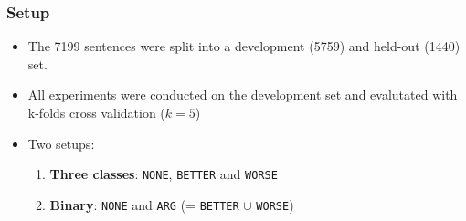 \documentclass[11pt,aspectratio=169,usenames,dvipsnames]{beamer}
\begin{document}
    
    
        \begin{frame}[t]
        \frametitle{Setup}
        \begin{itemize}
            \item The 7199 sentences were split into a development (5759) and held-out (1440) set.
            \item All experiments were conducted on the development set and evalutated with k-folds cross validation ($k = 5$)\pause
            \item Two setups: 
            \begin{enumerate}
            \item \textbf{Three classes}: \texttt{NONE}, \texttt{BETTER} and \texttt{WORSE}
            \item\textbf{Binary}: \texttt{NONE} and \texttt{ARG} (= \texttt{BETTER} $\cup$ \texttt{WORSE})
            \end{enumerate}
        \end{itemize}

    \end{frame}

    
    
\end{document}
